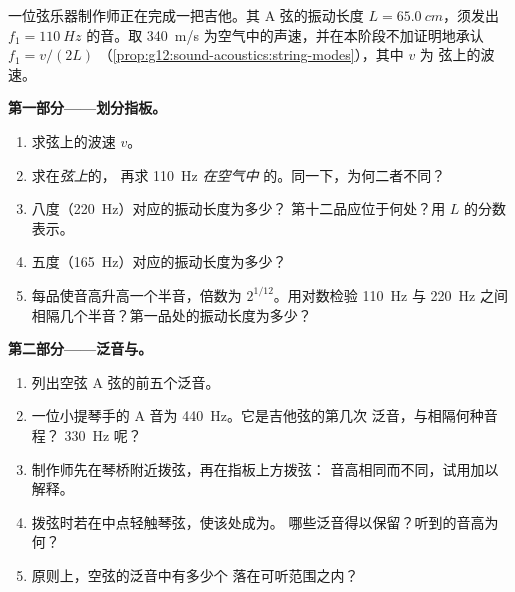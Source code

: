 \begin{problem}
\label{pb:g12:sound-acoustics:1}
一位弦乐器制作师正在完成一把吉他。其 A 弦的振动长度
$L = \qty{65.0}{cm}$，须发出 $f_1 = \qty{110}{Hz}$ 的音。取
\qty{340}{m/s} 为空气中的声速，并在本阶段不加证明地承认 $f_1 = v/(2L)$
（\cref{prop:g12:sound-acoustics:string-modes}），其中 $v$ 为
弦上的波速。

\medskip
\noindent\textbf{第一部分——划分指板。}
\begin{enumerate}
  \item 求弦上的波速 $v$。
  \item 求在\emph{弦上}的，
        再求 \qty{110}{Hz} \emph{在空气中
        }的。同一下，为何二者不同？
  \item 八度（\qty{220}{Hz}）对应的振动长度为多少？
        第十二品应位于何处？用 $L$ 的分数表示。
  \item 五度（\qty{165}{Hz}）对应的振动长度为多少？
  \item 每品使音高升高一个半音，倍数为
        $2^{1/12}$。用对数检验 \qty{110}{Hz} 与 \qty{220}{Hz} 之间
        相隔几个半音？第一品处的振动长度为多少？
\end{enumerate}

\medskip
\noindent\textbf{第二部分——泛音与。}
\begin{enumerate}[resume]
  \item 列出空弦 A 弦的前五个泛音。
  \item 一位小提琴手的 A 音为 \qty{440}{Hz}。它是吉他弦的第几次
        泛音，与相隔何种音程？
        \qty{330}{Hz} 呢？
  \item 制作师先在琴桥附近拨弦，再在指板上方拨弦：
        音高相同而不同，试用加以解释。
  \item 拨弦时若在中点轻触琴弦，使该处成为。
        哪些泛音得以保留？听到的音高为何？
  \item 原则上，空弦的泛音中有多少个
        落在可听范围之内？
\end{enumerate}


\end{problem}
